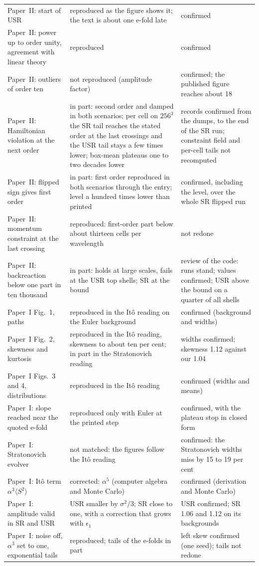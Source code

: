 \documentclass[aps,prd,twocolumn,10pt,superscriptaddress,nofootinbib,longbibliography,floatfix]{revtex4-2}
\newcommand{\Pone}{Paper~I}
\newcommand{\Ptwo}{Paper~II}
\begin{document}
\begin{table}
\begin{tabular}{p{}p{}p{}}
\Ptwo{}: start of USR & reproduced as the figure shows it; the text is about one e-fold late & confirmed \\
\Ptwo{}: power up to order unity, agreement with linear theory & reproduced & confirmed \\
\Ptwo{}: outliers of order ten & not reproduced (amplitude factor) & confirmed; the published figure reaches about 18 \\
\Ptwo{}: Hamiltonian violation at the next order & in part: second order and damped in both scenarios; per cell on $256^3$ the SR tail reaches the stated order at the last crossings and the USR tail stays a few times lower; box-mean plateaus one to two decades lower & records confirmed from the dumps, to the end of the SR run; constraint field and per-cell tails not recomputed \\
\Ptwo{}: flipped sign gives first order & in part: first order reproduced in both scenarios through the entry; level a hundred times lower than printed & confirmed, including the level, over the whole SR flipped run \\
\Ptwo{}: momentum constraint at the last crossing & reproduced: first-order part below about thirteen cells per wavelength & not redone \\
\Ptwo{}: backreaction below one part in ten thousand & in part: holds at large scales, fails at the USR top shells; SR at the bound & review of the code: runs stand; values confirmed; USR above the bound on a quarter of all shells \\
\midrule
\Pone{} Fig.~1, paths & reproduced in the It\^o reading on the Euler background & confirmed (background and widths) \\
\Pone{} Fig.~2, skewness and kurtosis & reproduced in the It\^o reading, skewness to about ten per cent; in part in the Stratonovich reading & widths confirmed; skewness 1.12 against our 1.04 \\
\Pone{} Figs.~3 and 4, distributions & reproduced in the It\^o reading & confirmed (widths and means) \\
\Pone{}: slope reached near the quoted e-fold & reproduced only with Euler at the printed step & confirmed, with the plateau stop in closed form \\
\Pone{}: Stratonovich evolver & not matched: the figures follow the It\^o reading & confirmed: the Stratonovich widths miss by 15 to 19 per cent \\
\Pone{}: It\^o term $\alpha^3\langle S^2\rangle$ & corrected: $\alpha^5$ (computer algebra and Monte Carlo) & confirmed (derivation and Monte Carlo) \\
\Pone{}: amplitude valid in SR and USR & USR smaller by $\sigma^2/3$; SR close to one, with a correction that grows with $\epsilon_1$ & USR confirmed; SR 1.06 and 1.12 on its backgrounds \\
\Pone{}: noise off, $\alpha^3$ set to one, exponential tails & reproduced; tails of the e-folds in part & left skew confirmed (one seed); tails not redone \\
\bottomrule
\end{tabular}
\end{table}
\end{document}
